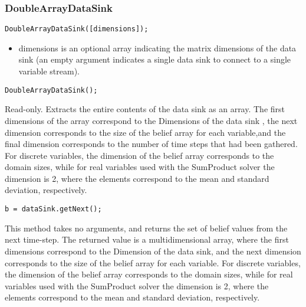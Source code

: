 \subsubsection{DoubleArrayDataSink}

\ifmatlab
\begin{lstlisting}
DoubleArrayDataSink([dimensions]);
\end{lstlisting}

\begin{itemize}
\item dimensions is an optional array indicating the matrix dimensions of the data sink (an empty argument indicates a single data sink to connect to a single variable stream).
\end{itemize}
\fi

\ifjava
\begin{lstlisting}
DoubleArrayDataSink();
\end{lstlisting}
\fi




Read-only.  Extracts the entire contents of the data sink as an array.  The first dimensions of the array correspond to the Dimensions of the data sink \ifmatlab, the next dimension corresponds to the size of the belief array for each variable,\fi and the final dimension corresponds to the number of time steps that had been gathered.  For discrete variables, the dimension of the belief array corresponds to the domain sizes, while for real variables used with the SumProduct solver the dimension is 2, where the elements correspond to the mean and standard deviation, respectively.





\ifmatlab
\begin{lstlisting}
b = dataSink.getNext();
\end{lstlisting}

This method takes no arguments, and returns the set of belief values from the next time-step.  The returned value is a multidimensional array, where the first dimensions correspond to the Dimension of the data sink, and the next dimension corresponds to the size of the belief array for each variable.  For discrete variables, the dimension of the belief array corresponds to the domain sizes, while for real variables used with the SumProduct solver the dimension is 2, where the elements correspond to the mean and standard deviation, respectively.

